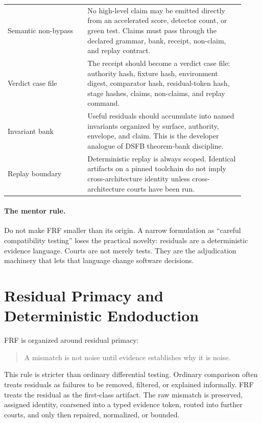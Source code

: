 \documentclass[11pt,a4paper]{article}
\newcommand{\frf}{\textsc{FRF}}
\begin{document}
\begin{longtable}{>{\raggedright\arraybackslash}p{0.31\linewidth}>{\raggedright\arraybackslash}p{0.61\linewidth}}
Semantic non-bypass & No high-level claim may be emitted directly from an accelerated score, detector count, or green test. Claims must pass through the declared grammar, bank, receipt, non-claim, and replay contract. \\
Verdict case file & The receipt should become a verdict case file: authority hash, fixture hash, environment digest, comparator hash, residual-token hash, stage hashes, claims, non-claims, and replay command. \\
Invariant bank & Useful residuals should accumulate into named invariants organized by surface, authority, envelope, and claim. This is the developer analogue of DSFB theorem-bank discipline. \\
Replay boundary & Deterministic replay is always scoped. Identical artifacts on a pinned toolchain do not imply cross-architecture identity unless cross-architecture courts have been run. \\
\bottomrule
\end{longtable}

\paragraph{The mentor rule.}
Do not make \frf{} smaller than its origin. A narrow formulation as ``careful compatibility testing'' loses the practical novelty: residuals are a deterministic evidence language. Courts are not merely tests. They are the adjudication machinery that lets that language change software decisions.

\section{Residual Primacy and Deterministic Endoduction}
\label{sec:endoduction}

\frf{} is organized around residual primacy:
\begin{quote}
A mismatch is not noise until evidence establishes why it is noise.
\end{quote}

This rule is stricter than ordinary differential testing. Ordinary comparison often treats residuals as failures to be removed, filtered, or explained informally. \frf{} treats the residual as the first-class artifact. The raw mismatch is preserved, assigned identity, coarsened into a typed evidence token, routed into further courts, and only then repaired, normalized, or bounded.
\end{document}
